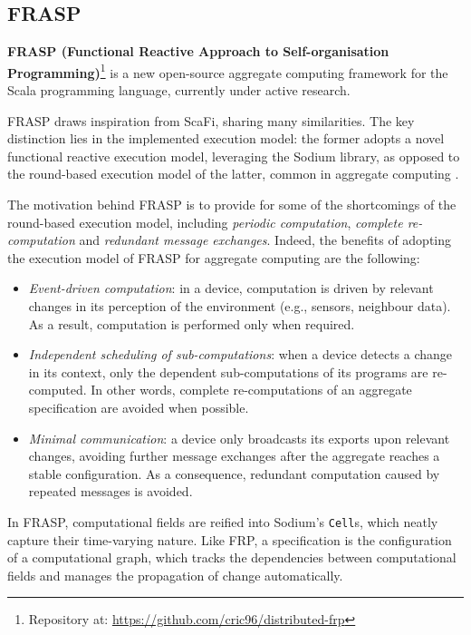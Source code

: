 
\subsection{FRASP}
\label{section:background:technologies:frasp}

\textbf{FRASP (Functional Reactive Approach to Self-organisation Programming)}\footnote{Repository at: \url{https://github.com/cric96/distributed-frp}}
is a new open-source aggregate computing framework for the Scala programming
language, currently under active research.

FRASP draws inspiration from \ac{ScaFi}, sharing many similarities. The key
distinction lies in the implemented execution model: the former adopts a novel
functional reactive execution model, leveraging the Sodium library, as opposed
to the round-based execution model of the latter, common in aggregate computing
\cite{FRASP}.

The motivation behind FRASP is to provide for some of the shortcomings of the
round-based execution model, including \textit{periodic computation},
\textit{complete re-computation} and \textit{redundant message exchanges}.
Indeed, the benefits of adopting the execution model of FRASP for aggregate
computing are the following:
\begin{itemize}
  \item \textit{Event-driven computation}: in a device, computation is driven
        by relevant changes in its perception of the environment (e.g.,
        sensors, neighbour data). As a result, computation is performed
        only when required.
  \item \textit{Independent scheduling of sub-computations}: when a device
        detects a change in its context, only the dependent sub-computations
        of its programs are re-computed. In other words, complete
        re-computations of an aggregate specification are avoided when possible.
  \item \textit{Minimal communication}: a device only broadcasts its exports
        upon relevant changes, avoiding further message exchanges after the
        aggregate reaches a stable configuration. As a consequence, redundant
        computation caused by repeated messages is avoided.
\end{itemize}

In FRASP, computational fields are reified into Sodium's \texttt{Cell}s, which
neatly capture their time-varying nature. Like \ac{FRP}, a specification is the
configuration of a computational graph, which tracks the dependencies between
computational fields and manages the propagation of change automatically.

